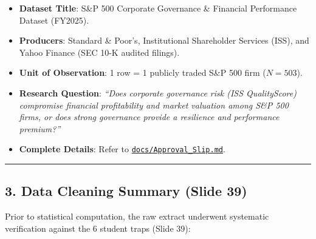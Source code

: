 \documentclass[
]{article}
\providecommand{\tightlist}{%
  \setlength{\itemsep}{0pt}\setlength{\parskip}{0pt}}
\begin{document}
\begin{itemize}
\tightlist
\item
  \textbf{Dataset Title}: S\&P 500 Corporate Governance \& Financial
  Performance Dataset (FY2025).
\item
  \textbf{Producers}: Standard \& Poor's, Institutional Shareholder
  Services (ISS), and Yahoo Finance (SEC 10-K audited filings).
\item
  \textbf{Unit of Observation}: 1 row = 1 publicly traded S\&P 500 firm
  (\(N = 503\)).
\item
  \textbf{Research Question}: \emph{``Does corporate governance risk
  (ISS QualityScore) compromise financial profitability and market
  valuation among S\&P 500 firms, or does strong governance provide a
  resilience and performance premium?''}
\item
  \textbf{Complete Details}: Refer to
  \href{file:///Users/david/Library/Mobile\%20Documents/com~apple~CloudDocs/Etudes\%20Supp/EMN\%20M1\%20/M1\%20-\%20S7/Data\%20Analysis\%20Quantitative/Group\%20Work\%20S&P\%20500/docs/Approval_Slip.md}{\texttt{docs/Approval\_Slip.md}}.
\end{itemize}

\begin{center}\rule{0.5\linewidth}{0.5pt}\end{center}

\subsection{3. Data Cleaning Summary (Slide
39)}\label{data-cleaning-summary-slide-39}

Prior to statistical computation, the raw extract underwent systematic
verification against the 6 student traps (Slide 39):
\end{document}
